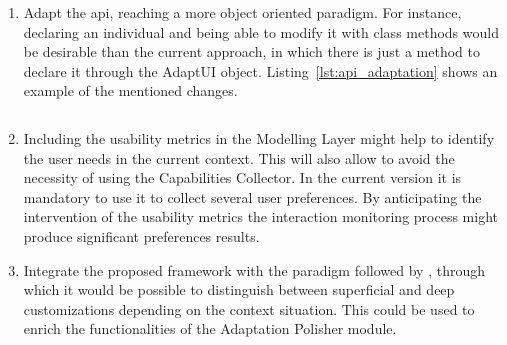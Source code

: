 \begin{enumerate}[label=\alph*)]
  \item Adapt the \ac{api}, reaching a more object oriented paradigm. For instance,
  declaring an individual and being able to modify it with class methods would 
  be desirable than the current approach, in which there is just a method to
  declare it through the AdaptUI object. Listing~\ref{lst:api_adaptation} shows
  an example of the mentioned changes.
  
  \inputminted[linenos=true, fontsize=\footnotesize, frame=lines]{java}{6_conclusion/api_adaptation.java}

  \item Including the usability metrics in the Modelling Layer might help to
  identify the user needs in the current context. This will also allow to avoid
  the necessity of using the Capabilities Collector. In the current version it
  is mandatory to use it to collect several user preferences. By anticipating
  the intervention of the usability metrics the interaction monitoring process
  might produce significant preferences results.
  
  
  \item Integrate the proposed framework with the paradigm followed by
  \citet{marmolin_medium_1995}, through which it would be possible to distinguish
  between superficial and deep customizations depending on the context situation.
  This could be used to enrich the functionalities of the Adaptation Polisher
  module.
\end{enumerate}